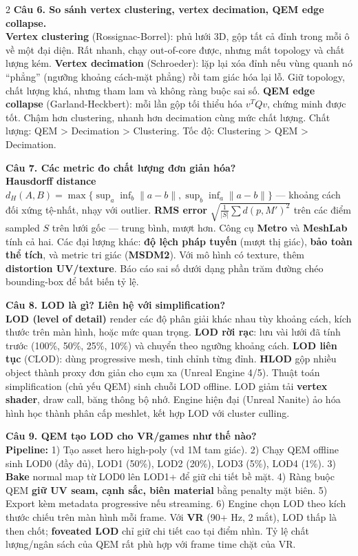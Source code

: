 \begin{paracol}{2}
\textbf{Câu 6. So sánh vertex clustering, vertex decimation, QEM edge collapse.}\\
\textbf{Vertex clustering} (Rossignac-Borrel): phủ lưới 3D, gộp tất cả đỉnh trong mỗi ô về một đại diện. Rất nhanh, chạy out-of-core được, nhưng mất topology và chất lượng kém. \textbf{Vertex decimation} (Schroeder): lặp lại xóa đỉnh nếu vùng quanh nó ``phẳng'' (ngưỡng khoảng cách-mặt phẳng) rồi tam giác hóa lại lỗ. Giữ topology, chất lượng khá, nhưng tham lam và không ràng buộc sai số. \textbf{QEM edge collapse} (Garland-Heckbert): mỗi lần gộp tối thiểu hóa $v^T Q v$, chứng minh được tốt. Chậm hơn clustering, nhanh hơn decimation cùng mức chất lượng. Chất lượng: QEM > Decimation > Clustering. Tốc độ: Clustering > QEM > Decimation.

\textbf{Câu 7. Các metric đo chất lượng đơn giản hóa?}\\
\textbf{Hausdorff distance} $d_H(A,B)=\max\{\sup_a\inf_b\|a-b\|, \sup_b\inf_a\|a-b\|\}$ — khoảng cách đối xứng tệ-nhất, nhạy với outlier. \textbf{RMS error} $\sqrt{\tfrac{1}{|S|}\sum d(p,M')^2}$ trên các điểm sampled $S$ trên lưới gốc — trung bình, mượt hơn. Công cụ \textbf{Metro} và \textbf{MeshLab} tính cả hai. Các đại lượng khác: \textbf{độ lệch pháp tuyến} (mượt thị giác), \textbf{bảo toàn thể tích}, và metric tri giác (\textbf{MSDM2}). Với mô hình có texture, thêm \textbf{distortion UV/texture}. Báo cáo sai số dưới dạng phần trăm đường chéo bounding-box để bất biến tỷ lệ.

\textbf{Câu 8. LOD là gì? Liên hệ với simplification?}\\
\textbf{LOD (level of detail)} render các độ phân giải khác nhau tùy khoảng cách, kích thước trên màn hình, hoặc mức quan trọng. \textbf{LOD rời rạc}: lưu vài lưới đã tính trước (100\%, 50\%, 25\%, 10\%) và chuyển theo ngưỡng khoảng cách. \textbf{LOD liên tục} (CLOD): dùng progressive mesh, tinh chỉnh từng đỉnh. \textbf{HLOD} gộp nhiều object thành proxy đơn giản cho cụm xa (Unreal Engine 4/5). Thuật toán simplification (chủ yếu QEM) sinh chuỗi LOD offline. LOD giảm tải \textbf{vertex shader}, draw call, băng thông bộ nhớ. Engine hiện đại (Unreal Nanite) ảo hóa hình học thành phân cấp meshlet, kết hợp LOD với cluster culling.

\textbf{Câu 9. QEM tạo LOD cho VR/games như thế nào?}\\
\textbf{Pipeline:} 1) Tạo asset hero high-poly (vd 1M tam giác). 2) Chạy QEM offline sinh LOD0 (đầy đủ), LOD1 (50\%), LOD2 (20\%), LOD3 (5\%), LOD4 (1\%). 3) \textbf{Bake} normal map từ LOD0 lên LOD1+ để giữ chi tiết bề mặt. 4) Ràng buộc QEM \textbf{giữ UV seam, cạnh sắc, biên material} bằng penalty mặt biên. 5) Export kèm metadata progressive nếu streaming. 6) Engine chọn LOD theo kích thước chiếu trên màn hình mỗi frame. Với \textbf{VR} (90+ Hz, 2 mắt), LOD thấp là then chốt; \textbf{foveated LOD} chỉ giữ chi tiết cao tại điểm nhìn. Tỷ lệ chất lượng/ngân sách của QEM rất phù hợp với frame time chặt của VR.


\end{paracol}
